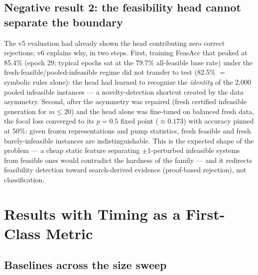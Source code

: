 \documentclass[12pt]{article}
\begin{document}
\subsection{Negative result 2: the feasibility head cannot separate the boundary}

The v5 evaluation had already shown the head contributing zero correct rejections; v6 explains why, in two steps. First, training FeasAcc that peaked at 85.4\% (epoch 29; typical epochs sat at the 79.7\% all-feasible base rate) under the fresh-feasible/pooled-infeasible regime did not transfer to test (82.5\% $=$ symbolic rules alone): the head had learned to recognize the \emph{identity} of the 2{,}000 pooled infeasible instances --- a novelty-detection shortcut created by the data asymmetry. Second, after the asymmetry was repaired (fresh certified infeasible generation for $m \leq 20$) and the head alone was fine-tuned on balanced fresh data, the focal loss converged to its $p = 0.5$ fixed point ($\approx 0.173$) with accuracy pinned at 50\%: given frozen representations and pump statistics, fresh feasible and fresh barely-infeasible instances are indistinguishable. This is the expected shape of the problem --- a cheap static feature separating $\pm 1$-perturbed infeasible systems from feasible ones would contradict the hardness of the family --- and it redirects feasibility detection toward search-derived evidence (proof-based rejection), not classification.

\section{Results with Timing as a First-Class Metric}

\subsection{Baselines across the size sweep}
\end{document}
